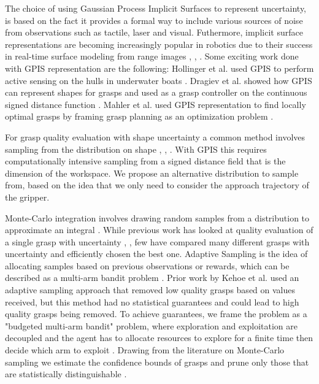 \documentclass[letterpaper, 10 pt, conference]{ieeeconf}  %
\begin{document}
 The choice of using Gaussian Process Implicit Surfaces to represent uncertainty, is based on the fact it provides a formal way to include various sources of noise from observations such as tactile, laser and visual. Futhermore, implicit surface representations are becoming increasingly popular in robotics due to their success in real-time surface modeling from range images \cite{curless1996volumetric}, \cite{newcombe2011kinectfusion}, \cite{hornung2013octomap}. Some exciting work done with GPIS representation are the following: Hollinger et al. used GPIS to perform active sensing on the hulls in underwater boats \cite{hollinger2013}. Dragiev et al. showed how GPIS can represent shapes for grasps and used  as a grasp controller on the continuous signed distance function \cite{dragiev2011}. Mahler et al. used GPIS representation to find locally optimal grasps by framing grasp planning as an optimization problem \cite{jeff}. %
 
  For grasp quality evaluation with shape uncertainty a common method involves sampling from the distribution on shape \cite{kehoe2012estimating}, \cite{kehoe2012toward}, \cite{christopoulos2007handling}. With GPIS this requires computationally intensive sampling from a signed distance field that is the dimension of the workspace. We propose an alternative distribution to sample from, based on the idea that we only need to consider the approach trajectory of the gripper. 

Monte-Carlo integration involves drawing random samples from a distribution to approximate an integral \cite{caflisch1998monte}. While previous work has looked at quality evaluation of a single grasp with uncertainty \cite{christopoulos2007handling}, \cite{zheng2005}, few have compared many different grasps with uncertainty and efficiently chosen the best one.  Adaptive Sampling is the idea of allocating samples based on previous observations or rewards, which can be described as a multi-arm bandit problem \cite{barto1998reinforcement}. Prior work by Kehoe et al. \cite{kehoe2012toward} used an adaptive sampling approach that removed low quality grasps based on values received, but this method had no statistical guarantees and could lead to high quality grasps being removed. To achieve guarantees, we frame the problem as a "budgeted multi-arm bandit" problem, where exploration and exploitation are decoupled and the agent has to allocate resources to explore for a finite time then decide which arm to exploit  \cite{madani2004budgeted}. Drawing from the literature on Monte-Carlo sampling we estimate the confidence bounds of grasps and prune only those that are statistically distinguishable \cite{caflisch1998monte}.  
\end{document}
